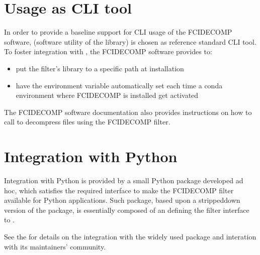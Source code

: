 \documentclass[a4paper,10pt,english]{sphinxmanual}
\begin{document}
\section{Usage as CLI tool}
\label{\detokenize{support_to_usage_patterns:usage-as-cli-tool}}
\sphinxAtStartPar
In order to provide a baseline support for CLI usage of the FCIDECOMP software,  (software utility of the
 library) is chosen as reference standard CLI tool. To foster integration with , the FCIDECOMP
software provides to:
\begin{itemize}
\item {} 
\sphinxAtStartPar
put the filter’s library to a specific path at installation

\item {} 
\sphinxAtStartPar
have the  environment variable automatically set each time a conda environment where FCIDECOMP is installed get activated

\end{itemize}

\sphinxAtStartPar
The FCIDECOMP software documentation also provides instructions on how to call  to decompress files using the
FCIDECOMP filter.


\section{Integration with Python}
\label{\detokenize{support_to_usage_patterns:integration-with-python}}
\sphinxAtStartPar
Integration with Python is provided by a small Python package developed ad hoc, which satisfies the required 
interface to make the FCIDECOMP filter available for Python applications. Such package, based upon a stripped\sphinxhyphen{}down
version of the {\hyperref[\detokenize{introduction:hdf5plugin}]{}} package, is essentially composed of an  defining the
filter interface to .

\sphinxAtStartPar
See the {\hyperref[\detokenize{a_integration_with_hdf5plugin:integration-with-hdf5plugin}]{}} for details on the integration with the widely used {\hyperref[\detokenize{introduction:hdf5plugin}]{}} package and interation
with its maintainers’ community.
\end{document}
